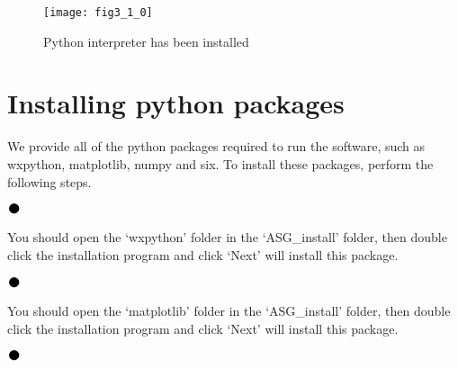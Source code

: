 \begin{figure}[ht]
\centering
\texttt{[image: fig3\_1\_0]}
\caption{\hspace{0.2cm}Python interpreter has been installed}
\end{figure}

\newpage
\section{\heiti Installing python packages}
\hspace{-0.2cm}We  provide all of the python packages required to run the software, such as wxpython, matplotlib, numpy and six. To install these packages, perform the following steps.
\vspace{0.3cm}

\noindent$\vcenter{\hbox{\huge$\bullet$}}$\quad\fontsize{12pt}{\baselineskip}\textbf{}

\hspace{-0.2cm}You should open the `wxpython' folder in the `ASG\_install' folder, then double click the installation program and click `Next' will install this package.
\vspace{0.3cm}

\noindent$\vcenter{\hbox{\huge$\bullet$}}$\quad\fontsize{12pt}{\baselineskip}\textbf{ }

\hspace{-0.2cm}You should open the `matplotlib' folder in the `ASG\_install' folder, then double click the installation program and click `Next' will install this package.
\vspace{0.3cm}

\noindent$\vcenter{\hbox{\huge$\bullet$}}$\quad\fontsize{12pt}{\baselineskip}\textbf{}

